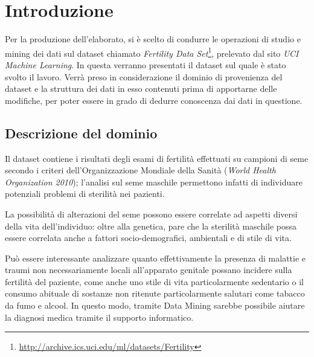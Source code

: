 \section{Introduzione}\label{sec:intro}

Per la produzione dell'elaborato, si è scelto di condurre le operazioni di studio e mining dei dati sul dataset chiamato \emph{Fertility Data Set}\footnote{\url{http://archive.ics.uci.edu/ml/datasets/Fertility}\label{note:dataset}}, prelevato dal sito \emph{UCI Machine Learning}.
In questa  verranno presentati il dataset sul quale è stato svolto il lavoro.
Verrà preso in considerazione il dominio di provenienza del dataset e la struttura dei dati in esso contenuti prima di apportarne delle modifiche,
per poter essere in grado di dedurre conoscenza dai dati in questione.

\subsection{Descrizione del dominio}\label{subsec:intro:domain}

Il dataset contiene i risultati degli esami di fertilità effettuati su campioni di seme secondo i criteri dell'Organizzazione Mondiale della Sanità (\emph{World Health Organization 2010});
l'analisi sul seme maschile permettono infatti di individuare potenziali problemi di sterilità nei pazienti.

La possibilità di alterazioni del seme possono essere correlate ad aspetti diversi della vita dell'individuo:
oltre alla genetica, pare che la sterilità maschile possa essere correlata anche a fattori socio-demografici, ambientali e di stile di vita.

Può essere interessante analizzare quanto effettivamente la presenza di malattie e traumi non necessariamente locali all'apparato genitale possano incidere sulla fertilità del paziente,
come anche uno stile di vita particolarmente sedentario o il consumo abituale di sostanze non ritenute particolarmente salutari come tabacco da fumo e alcool.
In questo modo, tramite Data Mining sarebbe possibile aiutare la diagnosi medica tramite il supporto informatico.

